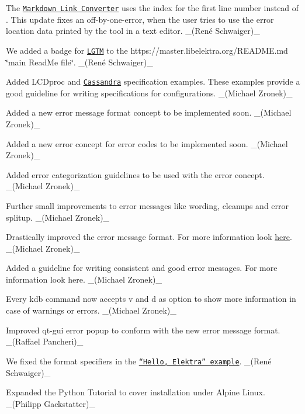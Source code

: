 \begin{DoxyItemize}
\item The \href{https://master.libelektra.org/doc/markdownlinkconverter}{\tt Markdown Link Converter} uses the index {} for the first line number instead of {}. This update fixes an off-\/by-\/one-\/error, when the user tries to use the error location data printed by the tool in a text editor. \+\_\+(René Schwaiger)\+\_\+
\item We added a badge for \href{https://lgtm.com}{\tt L\+G\+TM} to the https\+://master.libelektra.\+org/\+R\+E\+A\+D\+ME.md \char`\"{}main Read\+Me file\char`\"{}. \+\_\+(René Schwaiger)\+\_\+
\item Added L\+C\+Dproc and \href{/home/markus/Projekte/Elektra/current/examples/spec/cassandra.ini}{\tt Cassandra} specification examples. These examples provide a good guideline for writing specifications for configurations. \+\_\+(\+Michael Zronek)\+\_\+
\item Added a new error message format concept to be implemented soon. \+\_\+(\+Michael Zronek)\+\_\+
\item Added a new error concept for error codes to be implemented soon. \+\_\+(\+Michael Zronek)\+\_\+
\item Added error categorization guidelines to be used with the error concept. \+\_\+(\+Michael Zronek)\+\_\+
\item Further small improvements to error messages like wording, cleanups and error splitup. \+\_\+(\+Michael Zronek)\+\_\+
\item Drastically improved the error message format. For more information look \hyperlink{doc_decisions_error_message_format_md}{here}. \+\_\+(\+Michael Zronek)\+\_\+
\item Added a guideline for writing consistent and good error messages. For more information look here. \+\_\+(\+Michael Zronek)\+\_\+
\item Every {\ttfamily kdb} command now accepts {\ttfamily v} and {\ttfamily d} as option to show more information in case of warnings or errors. \+\_\+(\+Michael Zronek)\+\_\+
\item Improved qt-\/gui error popup to conform with the new error message format. \+\_\+(\+Raffael Pancheri)\+\_\+
\item We fixed the format specifiers in the \href{https://master.libelektra.org/examples/helloElektra.c}{\tt “\+Hello, Elektra” example}. \+\_\+(René Schwaiger)\+\_\+
\item Expanded the Python Tutorial to cover installation under Alpine Linux. \+\_\+(\+Philipp Gackstatter)\+\_\+

\end{DoxyItemize}
